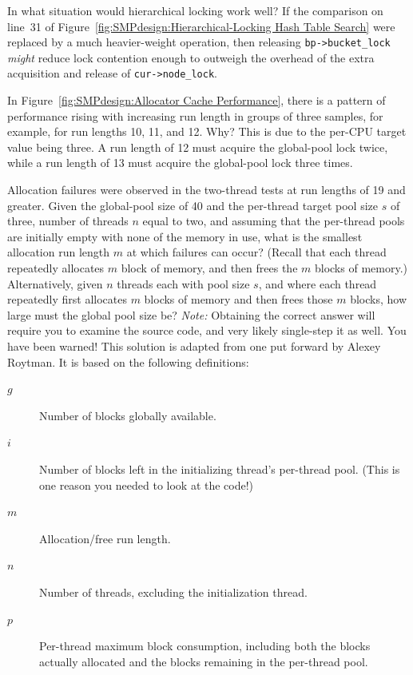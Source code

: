 \QuickQ{}
	In what situation would hierarchical locking work well?
\QuickA{}
	If the comparison on line~31 of
	Figure~\ref{fig:SMPdesign:Hierarchical-Locking Hash Table Search}
	were replaced by a much heavier-weight operation,
	then releasing {\tt bp->bucket\_lock} \emph{might} reduce lock
	contention enough to outweigh the overhead of the extra
	acquisition and release of {\tt cur->node\_lock}.

\QuickQ{}
	In Figure~\ref{fig:SMPdesign:Allocator Cache Performance},
	there is a pattern of performance rising with increasing run
	length in groups of three samples, for example, for run lengths
	10, 11, and 12.
	Why?
\QuickA{}
	This is due to the per-CPU target value being three.
	A run length of 12 must acquire the global-pool lock twice,
	while a run length of 13 must acquire the global-pool lock
	three times.

\QuickQ{}
	Allocation failures were observed in the two-thread
	tests at run lengths of 19 and greater.
	Given the global-pool size of 40 and the per-thread target
	pool size $s$ of three, number of threads $n$ equal to two,
	and assuming that the per-thread pools are initially
	empty with none of the memory in use, what is the smallest allocation
	run length $m$ at which failures can occur?
	(Recall that each thread repeatedly allocates $m$ block of memory,
	and then frees the $m$ blocks of memory.)
	Alternatively, given $n$ threads each with pool size $s$, and
	where each thread repeatedly first allocates $m$ blocks of memory
	and then frees those $m$ blocks, how large must the global pool
	size be?
	\emph{Note:} Obtaining the correct answer will require you to
	examine the  source code, and very likely
	single-step it as well.
	You have been warned!
\QuickA{}
	This solution is adapted from one put forward by Alexey Roytman.
	It is based on the following definitions:

	\begin{description}
	\item[$g$]	Number of blocks globally available.
	\item[$i$]	Number of blocks left in the initializing thread's
			per-thread pool.  (This is one reason you needed
			to look at the code!)
	\item[$m$]	Allocation/free run length.
	\item[$n$]	Number of threads, excluding the initialization thread.
	\item[$p$]	Per-thread maximum block consumption, including
			both the blocks actually allocated and the blocks
			remaining in the per-thread pool.
	\end{description}

